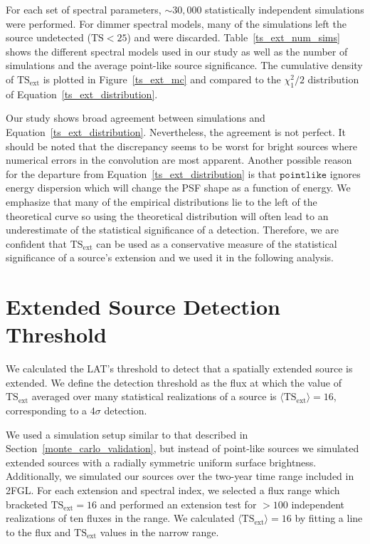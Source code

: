 \documentclass[12pt,preprint]{aastex}
\newcommand{\tsext}{{\ensuremath{\text{TS}_{\text{ext}}}}\xspace}
\newcommand{\ts}{\text{TS}\xspace}
\newcommand{\pointlike}{\ensuremath{\mathtt{pointlike}}\xspace}
\begin{document}
For each set of spectral parameters, $\sim30,000$ statistically independent
simulations were performed. For dimmer spectral models, many of the
simulations left the source undetected ($\ts<25$)
and were discarded.  Table~\ref{ts_ext_num_sims}
shows the different spectral models used in our study as well as the
number of simulations and the average point-like source
significance.  The cumulative density of \tsext is plotted in
Figure~\ref{ts_ext_mc} and compared to the $\chi^2_1/2$ distribution of
Equation~\ref{ts_ext_distribution}.

Our study shows broad agreement between simulations and
Equation~\ref{ts_ext_distribution}. Nevertheless, the agreement is not
perfect.  It should be noted that the discrepancy seems to be worst for
bright sources where numerical errors in the convolution
are most apparent.  Another possible
reason for the departure from Equation~\ref{ts_ext_distribution} 
is that \pointlike ignores energy dispersion which will change the
PSF shape as a function of energy. We emphasize that many of
the empirical distributions lie to the left of the theoretical curve so
using the theoretical distribution will often lead to an underestimate of the
statistical significance of a detection. Therefore, we are confident that
\tsext can be used as a conservative measure of the statistical
significance of a source's extension and we used it in the following analysis.


\section{Extended Source Detection Threshold}
\label{extension_sensitivity}

We calculated the LAT's threshold to detect that a spatially extended
source is extended. We define the detection threshold as the flux at which the value
of $\tsext$ averaged over many statistical realizations of a source
is $\langle\tsext\rangle=16$, corresponding to a $4\sigma$ detection.

We used a simulation setup similar to that described in
Section~\ref{monte_carlo_validation}, but instead of point-like sources
we simulated extended sources with a radially symmetric uniform surface
brightness. Additionally, we simulated our sources over the two-year
time range included in 2FGL.  For each extension and spectral index,
we selected a flux range which bracketed $\tsext=16$ and performed an
extension test for $>100$ independent realizations of ten fluxes in
the range.  We calculated $\langle\tsext\rangle=16$ by fitting a line
to the flux and $\tsext$ values in the narrow range.
\end{document}

